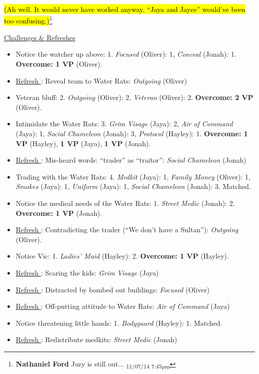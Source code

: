 \hl{(Ah well.  It would never have worked anyway.  ``Jaya and Jayce'' would've been too confusing.)}\footnote{\textbf{Nathaniel Ford }Jury is still out... \textsubscript{11/07/14 7:45pm}}



\underline{  {\LARGE Challenges \&  }  }\underline{  {\LARGE Refreshes }  }



\begin{itemize}
\item Notice the watcher up above: 1.  \textit{Focused} (Oliver): 1,\textit{ Conceal} (Jonah): 1.   \textbf{Overcome: 1 VP} (Oliver).
\item \underline{ Refresh }: Reveal team to Water Rats:\textit{ Outgoing} (Oliver)
\item Veteran bluff: 2.  \textit{Outgoing} (Oliver): 2,\textit{ Veteran} (Oliver): 2.  \textbf{Overcome: 2 VP} (Oliver).
\item Intimidate the Water Rats: 3.\textit{  Grim Visage} (Jaya): 2,\textit{ Air of Command} (Jaya): 1,\textit{ Social Chameleon} (Jonah): 3,\textit{ Protocol} (Hayley): 1.  \textbf{Overcome: 1 VP} (Hayley),\textbf{ 1 VP} (Jaya),\textbf{ 1 VP} (Jonah).
\item \underline{ Refresh }: Mis-heard words: ``trader'' as ``traitor'':\textit{ Social Chameleon} (Jonah)
\item Trading with the Water Rats: 4.\textit{  Medkit} (Jaya): 1,\textit{ Family Money} (Oliver): 1,  \textit{Smokes} (Jaya): 1,\textit{ Uniform} (Jaya): 1,\textit{ Social Chameleon} (Jonah): 3.  Matched.
\item Notice the medical needs of the Water Rats: 1.  \textit{Street Medic} (Jonah): 2.  \textbf{Overcome: 1 VP} (Jonah).
\item \underline{ Refresh }: Contradicting the trader (``We don't have a Sultan''):\textit{ Outgoing} (Oliver).
\item Notice Vic: 1.  \textit{Ladies' Maid} (Hayley): 2.  \textbf{Overcome: 1 VP} (Hayley).
\item \underline{ Refresh }: Scaring the kids:\textit{ Grim Visage} (Jaya)
\item \underline{ Refresh }: Distracted by bombed out buildings:\textit{ Focused} (Oliver)
\item \underline{ Refresh }: Off-putting attitude to Water Rats:\textit{ Air of Command} (Jaya)
\item Notice threatening little hands: 1.  \textit{Bodyguard} (Hayley): 1.  Matched.
\item \underline{ Refresh }: Redistribute medkits:\textit{ Street Medic} (Jonah)

\end{itemize}
